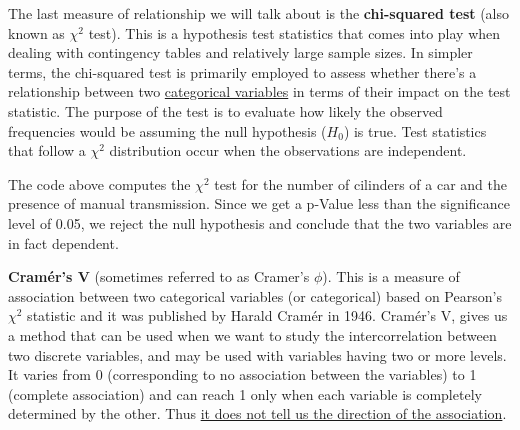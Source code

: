 \documentclass[
]{article}
\newenvironment{Shaded}{\begin{snugshade}}{\end{snugshade}}
\newcommand{\CommentTok}[1]{\textcolor[rgb]{0.56,0.35,0.01}{\textit{#1}}}
\newcommand{\FunctionTok}[1]{\textcolor[rgb]{0.13,0.29,0.53}{\textbf{#1}}}
\newcommand{\NormalTok}[1]{#1}
\newcommand{\SpecialCharTok}[1]{\textcolor[rgb]{0.81,0.36,0.00}{\textbf{#1}}}
\begin{document}
The last measure of relationship we will talk about is the \textbf{chi-squared
test} (also known as \(\chi^2\) test). This is a hypothesis test
statistics that comes into play when dealing with contingency tables and
relatively large sample sizes. In simpler terms, the chi-squared test is
primarily employed to assess whether there's a relationship between two
\ul{categorical variables} in terms of their impact on the test
statistic. The purpose of the test is to evaluate how likely the
observed frequencies would be assuming the null hypothesis (\(H_0\)) is
true. Test statistics that follow a \(\chi^2\) distribution occur when the
observations are independent.

\begin{Shaded}
\end{Shaded}

The code above computes the \(\chi^2\) test for the number of cilinders of
a car and the presence of manual transmission. Since we get a p-Value
less than the significance level of 0.05, we reject the null hypothesis
and conclude that the two variables are in fact dependent.

\textbf{Cramér's V} (sometimes referred to as Cramer's \(\phi\)). This is a
measure of association between two categorical variables (or
categorical) based on Pearson's \(\chi^2\) statistic and it was published
by Harald Cramér in 1946. Cramér's V, gives us a method that can be used
when we want to study the intercorrelation between two discrete
variables, and may be used with variables having two or more levels. It
varies from 0 (corresponding to no association between the variables) to
1 (complete association) and can reach 1 only when each variable is
completely determined by the other. Thus \ul{it does not tell us the
direction of the association}.

\begin{Shaded}
\end{Shaded}
\end{document}
